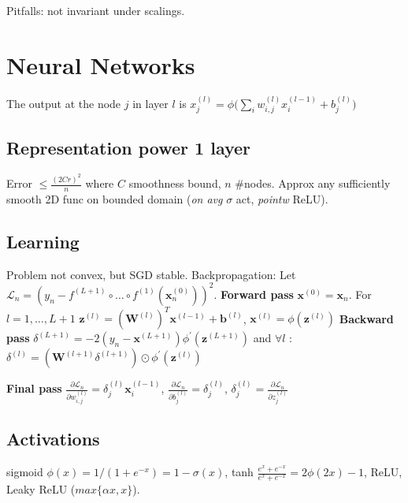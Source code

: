 Pitfalls: not invariant under scalings.

\section{Neural Networks}
The output at the node $j$ in layer $l$ is $x_j^{(l)} = \phi \big(\sum_i w_{i,j}^{(l)}x_i^{(l-1)} + b_j^{(l)} \big)$
\subsection{Representation power 1 layer}
Error $\le \frac{(2Cr)^2}{n}$ where $C$ smoothness bound, $n$ \#nodes. Approx any sufficiently smooth 2D func on bounded domain (\textit{on avg} $\sigma$ act, \textit{pointw} ReLU).
\subsection{Learning}
Problem not convex, but SGD stable. Backpropagation:
Let $\mathcal{L}_n = (y_n - f^{(L+1)} \circ \dots \circ f^{(1)}(\mathbf{x}^{(0)}_n))^2$.\newline
\textbf{Forward pass} \newline $\mathbf{x}^{(0)}=\mathbf{x}_n$. For $l=1,\dots,L+1$ \newline
$\mathbf{z}^{(l)} = (\mathbf{W}^{(l)})^T\mathbf{x}^{(l-1)}+\mathbf{b}^{(l)}$, $\mathbf{x}^{(l)} = \phi(\mathbf{z}^{(l)})$\newline
\textbf{Backward pass} \newline $\delta^{(L+1)} = -2(y_n-\mathbf{x}^{(L+1)})\phi^{'}(\mathbf{z}^{(L+1)})$ and $\forall l$ :
$\delta^{(l)} = (\mathbf{W}^{(l+1)}\delta^{(l+1)}) \odot \phi^{'}(\mathbf{z}^{(l)})$ \newline

\textbf{Final pass} \newline
$\frac{\partial{\mathcal{L}}_n}{\partial w_{i,j}^{(l)}} = \delta^{(l)}_j \mathbf{x}_i^{(l-1)}$, $\frac{\partial{\mathcal{L}}_n}{\partial b_{j}^{(l)}} = \delta_j^{(l)}$, $\delta_j^{(l)}=\frac{\partial{\mathcal{L}}_n}{\partial z_{j}^{(l)}}$

\subsection{Activations}
sigmoid $\phi(x) = 1/(1+e^{-x})= 1 -\sigma(x)$, tanh $\frac{e^x+e^{-x}}{e^x+e^{-x}} = 2 \phi(2x)-1$, ReLU, Leaky ReLU ($max\{\alpha x, x\}$).

